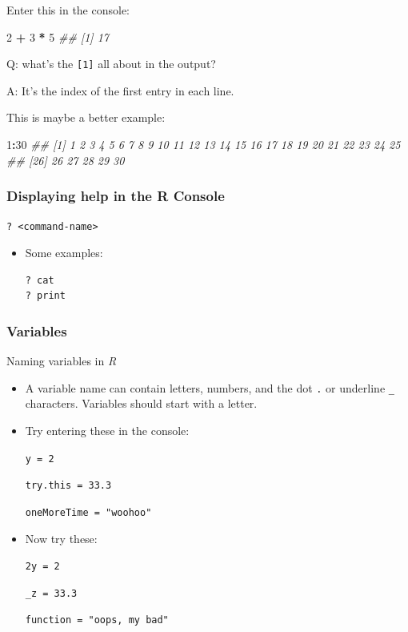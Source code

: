 \documentclass[]{book}
\newenvironment{Shaded}{\begin{snugshade}}{\end{snugshade}}
\newcommand{\CommentTok}[1]{\textcolor[rgb]{0.56,0.35,0.01}{\textit{#1}}}
\newcommand{\DecValTok}[1]{\textcolor[rgb]{0.00,0.00,0.81}{#1}}
\newcommand{\OperatorTok}[1]{\textcolor[rgb]{0.81,0.36,0.00}{\textbf{#1}}}
\newcommand{\StringTok}[1]{\textcolor[rgb]{0.31,0.60,0.02}{#1}}
\begin{document}
Enter this in the console:

\begin{Shaded}
\begin{Highlighting}[]
\DecValTok{2} \OperatorTok{+}\StringTok{ }\DecValTok{3} \OperatorTok{*}\StringTok{ }\DecValTok{5}
\CommentTok{## [1] 17}
\end{Highlighting}
\end{Shaded}

Q: what's the \texttt{{[}1{]}} all about in the output?

A: It's the index of the first entry in each line.

This is maybe a better example:

\begin{Shaded}
\begin{Highlighting}[]
\DecValTok{1}\OperatorTok{:}\DecValTok{30}
\CommentTok{##  [1]  1  2  3  4  5  6  7  8  9 10 11 12 13 14 15 16 17 18 19 20 21 22 23 24 25}
\CommentTok{## [26] 26 27 28 29 30}
\end{Highlighting}
\end{Shaded}

\hypertarget{displaying-help-in-the-r-console}{%
\subsubsection*{Displaying help in the R Console}\label{displaying-help-in-the-r-console}}

\texttt{?\ \textless{}command-name\textgreater{}}

\begin{itemize}
\item
  Some examples:

\begin{verbatim}
? cat
? print
\end{verbatim}
\end{itemize}

\hypertarget{variables}{%
\subsubsection*{Variables}\label{variables}}

Naming variables in \emph{R}

\begin{itemize}
\item
  A variable name can contain letters, numbers, and the dot \texttt{.} or underline \texttt{\_} characters. Variables should start with a letter.
\item
  Try entering these in the console:

  \texttt{y\ =\ 2}

  \texttt{try.this\ =\ 33.3}

  \texttt{oneMoreTime\ =\ "woohoo"}
\item
  Now try these:

  \texttt{2y\ =\ 2}

  \texttt{\_z\ =\ 33.3}

  \texttt{function\ =\ "oops,\ my\ bad"}
\end{itemize}
\end{document}
